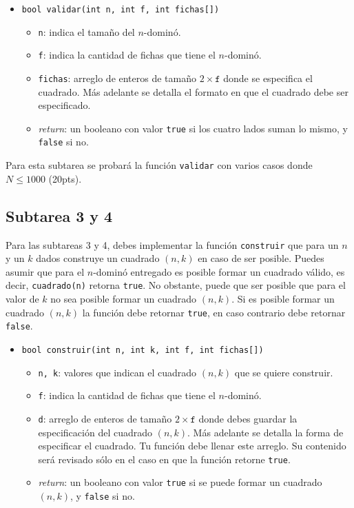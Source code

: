 \documentclass{oci}
\begin{document}
\begin{itemize}
 \item \verb+bool validar(int n, int f, int fichas[])+
 \begin{itemize}
  \item \verb+n+: indica el tamaño del $n$-dominó.
  \item \verb+f+: indica la cantidad de fichas que tiene el $n$-dominó.
  \item \verb+fichas+: arreglo de enteros de tamaño $2\times\texttt{f}$ donde se especifica el cuadrado. Más adelante se detalla el formato en que el cuadrado debe ser especificado.
  \item \emph{return}: un booleano con valor \verb+true+ si los cuatro lados suman lo mismo, y \verb+false+ si no.
 \end{itemize}
\end{itemize}

Para esta subtarea se probará la función \verb+validar+ con varios casos donde $N\leq 1000$ (20pts).

\subsection*{Subtarea 3 y 4}
Para las subtareas 3 y 4, debes implementar la función \verb+construir+ que para un $n$ y un $k$ dados construye un cuadrado $(n,k)$ en caso de ser posible.
Puedes asumir que para el $n$-dominó entregado es posible formar un cuadrado válido, es decir, \verb+cuadrado(n)+ retorna \verb+true+.
No obstante, puede que ser posible que para el valor de $k$ no sea posible formar un cuadrado $(n,k)$.
Si es posible formar un cuadrado $(n,k)$ la función debe retornar \verb+true+, en caso contrario debe retornar \verb+false+.
\begin{itemize}
 \item \verb+bool construir(int n, int k, int f, int fichas[])+
 \begin{itemize}
  \item \verb+n, k+: valores que indican el cuadrado $(n,k)$ que se quiere construir.
  \item \verb+f+: indica la cantidad de fichas que tiene el $n$-dominó.
  \item \verb+d+: arreglo de enteros de tamaño $2\times\texttt{f}$ donde debes guardar la especificación del cuadrado $(n,k)$. Más adelante se detalla la forma de especificar el cuadrado.
    Tu función debe llenar este arreglo. Su contenido será revisado sólo en el caso en que la función retorne \verb+true+.
  \item \emph{return}: un booleano con valor \verb+true+ si se puede formar un cuadrado $(n,k)$, y \verb+false+ si no.
 \end{itemize}
\end{itemize}
\end{document}
